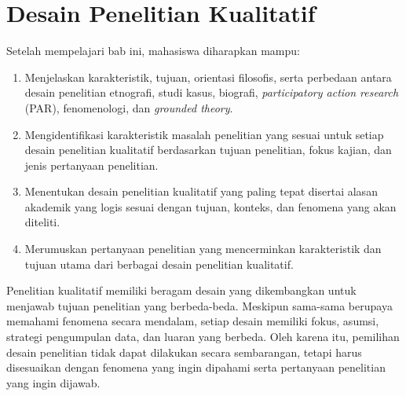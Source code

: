 \documentclass[
  indonesian,
  letterpaper,
  DIV=11,
  numbers=noendperiod]{scrreprt}
\providecommand{\tightlist}{%
  \setlength{\itemsep}{0pt}\setlength{\parskip}{0pt}}
\begin{document}
\chapter{Desain Penelitian Kualitatif}\label{sec-desainkuali}

\begin{tcolorbox}[enhanced jigsaw, colframe=quarto-callout-note-color-frame, toptitle=1mm, breakable, leftrule=.75mm, arc=.35mm, toprule=.15mm, colback=white, colbacktitle=quarto-callout-note-color!10!white, bottomtitle=1mm, bottomrule=.15mm, titlerule=0mm, title=\textcolor{quarto-callout-note-color}{\faInfo}\hspace{0.5em}{Capaian Pembelajaran}, coltitle=black, left=2mm, opacitybacktitle=0.6, opacityback=0, rightrule=.15mm]

Setelah mempelajari bab ini, mahasiswa diharapkan mampu:

\begin{enumerate}
\def\labelenumi{\arabic{enumi}.}
\tightlist
\item
  Menjelaskan karakteristik, tujuan, orientasi filosofis, serta
  perbedaan antara desain penelitian etnografi, studi kasus, biografi,
  \emph{participatory action research} (PAR), fenomenologi, dan
  \emph{grounded theory}.
\item
  Mengidentifikasi karakteristik masalah penelitian yang sesuai untuk
  setiap desain penelitian kualitatif berdasarkan tujuan penelitian,
  fokus kajian, dan jenis pertanyaan penelitian.
\item
  Menentukan desain penelitian kualitatif yang paling tepat disertai
  alasan akademik yang logis sesuai dengan tujuan, konteks, dan fenomena
  yang akan diteliti.
\item
  Merumuskan pertanyaan penelitian yang mencerminkan karakteristik dan
  tujuan utama dari berbagai desain penelitian kualitatif.
\end{enumerate}

\end{tcolorbox}

Penelitian kualitatif memiliki beragam desain yang dikembangkan untuk
menjawab tujuan penelitian yang berbeda-beda. Meskipun sama-sama
berupaya memahami fenomena secara mendalam, setiap desain memiliki
fokus, asumsi, strategi pengumpulan data, dan luaran yang berbeda. Oleh
karena itu, pemilihan desain penelitian tidak dapat dilakukan secara
sembarangan, tetapi harus disesuaikan dengan fenomena yang ingin
dipahami serta pertanyaan penelitian yang ingin dijawab.
\end{document}

